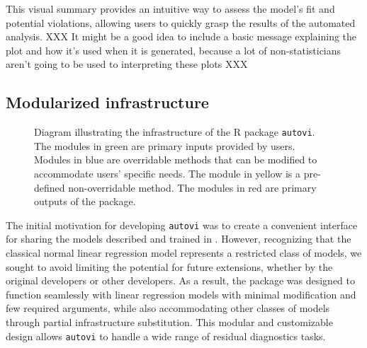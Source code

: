 \documentclass[
doublespace,
  times]{anzsauth}
\begin{document}
This visual summary provides an intuitive way to assess the model's fit
and potential violations, allowing users to quickly grasp the results of
the automated analysis. XXX It might be a good idea to include a basic
message explaining the plot and how it's used when it is generated,
because a lot of non-statisticians aren't going to be used to
interpreting these plots XXX

\subsection{Modularized infrastructure}\label{sec-autovi-infrastructure}

\begin{figure}


\caption{\label{fig-autovi-diag}Diagram illustrating the infrastructure
of the R package \texttt{autovi}. The modules in green are primary
inputs provided by users. Modules in blue are overridable methods that
can be modified to accommodate users' specific needs. The module in
yellow is a pre-defined non-overridable method. The modules in red are
primary outputs of the package.}

\end{figure}%

The initial motivation for developing \texttt{autovi} was to create a
convenient interface for sharing the models described and trained in
\citet{li2024automated}. However, recognizing that the classical normal
linear regression model represents a restricted class of models, we
sought to avoid limiting the potential for future extensions, whether by
the original developers or other developers. As a result, the package
was designed to function seamlessly with linear regression models with
minimal modification and few required arguments, while also
accommodating other classes of models through partial infrastructure
substitution. This modular and customizable design allows
\texttt{autovi} to handle a wide range of residual diagnostics tasks.
\end{document}
